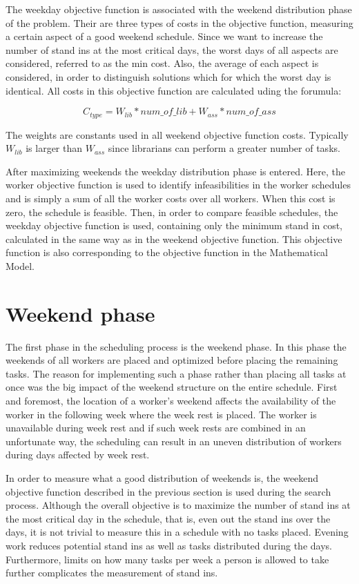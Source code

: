 The weekday objective function is associated with the weekend distribution phase of the problem. Their are three types of costs in the objective function, measuring a certain aspect of a good weekend schedule. Since we want to increase the number of stand ins at the most critical days, the worst days of all aspects are considered, referred to as the min cost. Also, the average of each aspect is considered, in order to distinguish solutions which for which the worst day is identical. All costs in this objective function are calculated uding the forumula:

\begin{equation}
\label{eq:wend_cost_calc}
C_{type} = W_{lib}*num\_of\_lib + W_{ass}*num\_of\_ass
\end{equation}

The weights are constants used in all weekend objective function costs. Typically $W_{lib}$ is larger than $W_{ass}$ since librarians can perform a greater number of tasks.

After maximizing weekends the weekday distribution phase is entered. Here, the worker objective function is used to identify infeasibilities in the worker schedules and is simply a sum of all the worker costs over all workers. When this cost is zero, the schedule is feasible. Then, in order to compare feasible schedules, the weekday objective function is used, containing only the minimum stand in cost, calculated in the same way as in the weekend objective function. This objective function is also corresponding to the objective function in the Mathematical Model.

\section{Weekend phase}

The first phase in the scheduling process is the weekend phase. In this phase the weekends of all workers are placed and optimized before placing the remaining tasks. The reason for implementing such a phase rather than placing all tasks at once was the big impact of the weekend structure on the entire schedule. First and foremost, the location of a worker's weekend affects the availability of the worker in the following week where the week rest is placed. The worker is unavailable during week rest and if such week rests are combined in an unfortunate way, the scheduling can result in an uneven distribution of workers during days affected by week rest.

In order to measure what a good distribution of weekends is, the weekend objective function described in the previous section is used during the search process. Although the overall objective is to maximize the number of stand ins at the most critical day in the schedule, that is, even out the stand ins over the days, it is not trivial to measure this in a schedule with no tasks placed. Evening work reduces potential stand ins as well as tasks distributed during the days. Furthermore, limits on how many tasks per week a person is allowed to take further complicates the measurement of stand ins.

